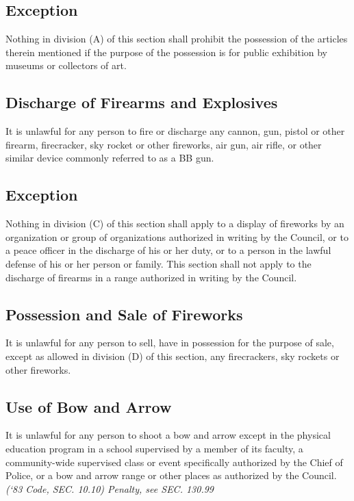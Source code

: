 \subsection{Exception}
Nothing in division (A) of this section shall prohibit the possession of the articles therein mentioned if the purpose of the possession is for public exhibition by museums or collectors of art.
\subsection{Discharge of Firearms and Explosives}
It is unlawful for any person to fire or discharge any cannon, gun, pistol or other firearm, firecracker, sky rocket or other fireworks, air gun, air rifle, or other similar device commonly referred to as a BB gun.
\subsection{Exception}
Nothing in division (C) of this section shall apply to a display of fireworks by an organization or group of organizations authorized in writing by the Council, or to a peace officer in the discharge of his or her duty, or to a person in the lawful defense of his or her person or family.  This section shall not apply to the discharge of firearms in a range authorized in writing by the Council.
\subsection{Possession and Sale of Fireworks}
It is unlawful for any person to sell, have in possession for the purpose of sale, except as allowed in division (D) of this section, any firecrackers, sky rockets or other fireworks.
\subsection{Use of Bow and Arrow}
It is unlawful for any person to shoot a bow and arrow except in the physical education program in a school supervised by a member of its faculty, a community-wide supervised class or event specifically authorized by the Chief of Police, or a bow and arrow range or other places as authorized by the Council.\\
\emph{(‘83 Code, SEC. 10.10)  Penalty, see SEC. 130.99}

